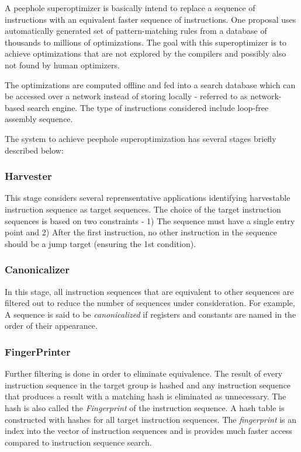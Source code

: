 \documentclass[sigconf]{acmart}
\begin{document}
A peephole superoptimizer is basically intend to replace a sequence of instructions with an equivalent faster sequence of instructions. One proposal \cite{peephole2006} uses automatically generated set of pattern-matching rules from a database of thousands to millions of optimizations. The goal with this superoptimizer is to achieve optimizations that are not explored by the compilers and possibly also not found by human optimizers. 

The optimizations are computed offline and fed into a search database which can be accessed over a network instead of storing locally - referred to as network-based search engine. 
The type of instructions considered include loop-free assembly sequence. 

The system to achieve peephole superoptimization has several stages briefly described below:

\subsubsection{Harvester}

This stage considers several reprensentative applications identifying harvestable instruction sequence as target sequences. The choice of the target instruction sequences is based on two constraints - 1) The sequence must have a single entry point and 2) After the first instruction, no other instruction in the sequence should be a jump target (ensuring the 1st condition).   

\subsubsection{Canonicalizer}

In this stage, all instruction sequences that are equivalent to other sequences are filtered out to reduce the number of sequences under consideration. For example, A sequence is said to be \textit{canonicalized} if registers and constants are named in the order of their appearance. 


\subsubsection{FingerPrinter}

Further filtering is done in order to eliminate equivalence. The result of every instruction sequence in the target group is hashed and any instruction sequence that produces a result with a matching hash is eliminated as unnecessary. The hash is also called the \textit{Fingerprint} of the instruction sequence. A hash table is constructed with hashes for all target instruction sequences. The \textit{fingerprint} is an index into the vector of instruction sequences and is provides much faster access compared to instruction sequence search. 
\end{document}
